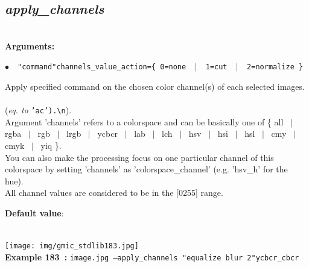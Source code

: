 \documentclass[a4paper,10.5pt,twoside]{book}
\def\comma{\discretionary{,}{}{,}}
\newcommand{\Cb}[1]{\textcolor{cb}{#1}}
\newcommand{\Cc}[1]{\textcolor{cc}{#1}}
\begin{document}
\subsection{\emph{apply\_channels} }\vspace*{-0.7em}
~\\\textbf{\Cb{Arguments: }}\begin{flushleft}
{\small \Cb{\hspace*{0.5cm}$\bullet$~~\texttt{"command"{\comma}channels{\comma}\_value\_action=\{ 0=none ~$|$~ 1=cut ~$|$~ 2=normal\-ize \}}}}\end{flushleft}
Apply specified command on the chosen color channel(s) of each selected images.
~\\(\emph{eq. to} {\small \texttt{'ac').\textbackslash n}}).
~\\Argument 'channels' refers to a colorspace{\comma} and can be basically one of \{ all ~$|$~ rgba ~$|$~ rgb ~$|$~ lrgb ~$|$~ ycbcr ~$|$~ lab ~$|$~ lch ~$|$~ hsv ~$|$~ hsi ~$|$~ hsl ~$|$~ cmy ~$|$~ cmyk ~$|$~ yiq \}.
~\\You can also make the processing focus on one particular channel of this colorspace{\comma} by setting 'channels' as 'colorspace\_channel' (e.g. 'hsv\_h' for the hue).
~\\All channel values are considered to be in the [0{\comma}255] range.
\begin{flushleft}\Cc{\textbf{Default value}:\\~\\\hspace*{0.5cm}{\small $\bullet$~~\texttt{'value\_action=0'.}}}\end{flushleft}
\begin{center}\texttt{[image: img/gmic\_stdlib183.jpg]}\\
{\footnotesize \textbf{Example 183~:} \texttt{image.jpg --apply\_channels "equalize blur 2"{\comma}ycbcr\_cbcr}}
\end{center}
\end{document}
